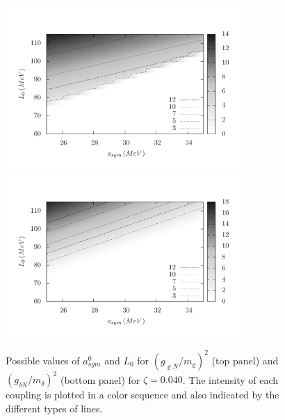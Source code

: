 \documentclass[twocolumn,showpacs,aps]{revtex4}
\begin{document}
\begin{figure}[ht]
\centering
  \includegraphics[width=9cm]{map_l0040_gr.png}
      \centering
  \includegraphics[width=9cm]{map_l0040_gd.png}
      \caption{Possible values of $a_{sym}^0$ and $L_0$ for $(g_{\varrho N}/m_{\varrho})^2$ (top panel) and 
      $(g_{\delta N}/m_{\delta})^2$ (bottom panel) for $\zeta=0.040$. The intensity of each coupling is plotted
      in a color sequence and also indicated by the different types of lines. }\label{map_l0040}
\end{figure} 
\end{document}
